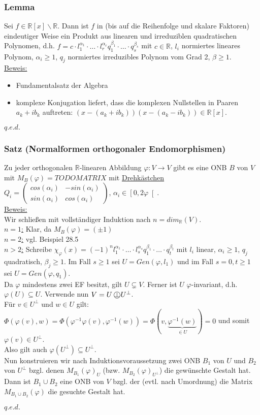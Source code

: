 \documentclass[a4paper]{article}
\newcommand*{\obot}{\perp\mkern-20.7mu\bigcirc}
\newcommand{\ul}{\underline}
\renewcommand{\proof}{\ul{Beweis:}\\}
\renewcommand{\qed}{\begin{flushright}
\ul{\(q.e.d.\)}
\end{flushright}}
\let\phi\varphi
\begin{document}
\subsubsection{Lemma}
Sei \(f\in \mathbb{R}\left[x\right]\backslash\mathbb{R}\). Dann ist \(f\) in (bis auf die Reihenfolge und skalare Faktoren) eindeutiger Weise ein Produkt aus linearen und irreduziblen quadratischen Polynomen, d.h. \(f=c\cdot l_1^{\alpha_1}\cdot\dots\cdot l_r^{\alpha_r}q_1^{\beta_1}\cdot\dots\cdot q_s^{\beta_s}\) mit \(c\in\mathbb{R}\), \(l_i\) normiertes lineares Polynom, \(\alpha_i\geq 1\), \(q_j\) normiertes irreduzibles Polynom vom Grad 2, \(\beta\geq 1\).\\
\proof
\begin{itemize}
\item Fundamentalsatz der Algebra
\item komplexe Konjugation liefert, dass die komplexen Nullstellen in Paaren \(a_k+ib_k\) auftreten: \((x-(a_k+ib_k))(x-(a_k-ib_k))\in\mathbb{R}\left[x\right]\).
\end{itemize}
\qed
\subsubsection{Satz (Normalformen orthogonaler Endomorphismen)}
Zu jeder orthogonalen \(\mathbb{R}\)-linearen Abbildung \(\phi:V\rightarrow V\) gibt es eine ONB \(B\) von \(V\) mit \(M_B(\phi)=TODO MATRIX\) mit \ul{Drehkästchen} \(Q_i=\begin{pmatrix}
cos(\alpha_i) & -sin(\alpha_i)\\
sin(\alpha_i) & cos(\alpha_i)
\end{pmatrix}\), \(\alpha_i\in \left[ 0,2\phi\right[\).\\
\proof
Wir schließen mit vollständiger Induktion nach \(n=dim_\mathbb{R}(V)\).\\
\ul{\(n=1\):} Klar, da \(M_B(\phi)=(\pm 1)\)\\
\ul{\(n=2\):} vgl. Beispiel 28.5\\
\ul{\(n>2\):} Schreibe \(\chi_\phi(x)=(-1)^nl_1^{\alpha_1}\cdot\dots\cdot l_s^{\alpha_s}q_1^{\beta_1}\cdot\dots\cdot q_t^{\beta_t}\) mit \(l_i\) linear, \(\alpha_i\geq 1\), \(q_j\) quadratisch, \(\beta_j\geq 1\). Im Fall \(s\geq 1\) sei \(U=Gen(\phi, l_1)\) und im Fall \(s=0, t\geq 1\) sei \(U=Gen(\phi,q_1)\).\\
Da \(\phi\) mindestens zwei EF besitzt, gilt \(U\subsetneq V\). Ferner ist \(U\) \(\phi\)-invariant, d.h. \(\phi(U)\subseteq U\). Verwende nun \(V=U\obot U^\bot\).\\
Für \(v\in U^\bot\) und \(w\in U\) gilt: \(\Phi(\phi(v), w)=\Phi(\phi^{-1}\phi(v), \phi^{-1}(w))=\Phi(v, \underbrace{\phi^{-1}(w)}_{\in U})=0\) und somit \(\phi(v)\in U^\bot\).\\
Also gilt auch \(\phi(U^\bot)\subseteq U^\bot\).\\
Nun konstruieren wir nach Induktionsvoraussetzung zwei ONB \(B_1\) von \(U\) und \(B_2\) von \(U^\bot\) bzgl. denen \(M_{B_1}(\phi)_U\) (bzw. \(M_{B_2}(\phi)_{U^\bot}\)) die gewünschte Gestalt hat. Dann ist \(B_1\cup B_2\) eine ONB von \(V\) bzgl. der (evtl. nach Umordnung)  die Matrix \(M_{B_1\cup B_2}(\phi)\) die gesuchte Gestalt hat.
\qed
\end{document}
